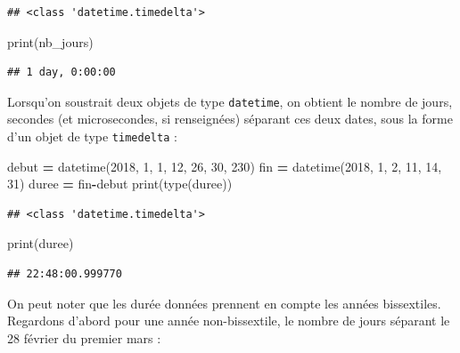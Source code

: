 \documentclass[12pt,]{book}
\newenvironment{Shaded}{\begin{snugshade}}{\end{snugshade}}
\newcommand{\DecValTok}[1]{\textcolor[rgb]{0.00,0.00,0.81}{#1}}
\newcommand{\OperatorTok}[1]{\textcolor[rgb]{0.81,0.36,0.00}{\textbf{#1}}}
\newcommand{\BuiltInTok}[1]{#1}
\newcommand{\NormalTok}[1]{#1}
\numberwithin{equation}{section}
\numberwithin{countremarque}{section}
\begin{document}
\begin{lstlisting}
## <class 'datetime.timedelta'>
\end{lstlisting}

\begin{Shaded}
\begin{Highlighting}[]
\BuiltInTok{print}\NormalTok{(nb_jours)}
\end{Highlighting}
\end{Shaded}

\begin{lstlisting}
## 1 day, 0:00:00
\end{lstlisting}

Lorsqu'on soustrait deux objets de type \texttt{datetime}, on obtient le
nombre de jours, secondes (et microsecondes, si renseignées) séparant
ces deux dates, sous la forme d'un objet de type \texttt{timedelta} :

\begin{Shaded}
\begin{Highlighting}[]
\NormalTok{debut }\OperatorTok{=}\NormalTok{ datetime(}\DecValTok{2018}\NormalTok{, }\DecValTok{1}\NormalTok{, }\DecValTok{1}\NormalTok{, }\DecValTok{12}\NormalTok{, }\DecValTok{26}\NormalTok{, }\DecValTok{30}\NormalTok{, }\DecValTok{230}\NormalTok{)}
\NormalTok{fin }\OperatorTok{=}\NormalTok{ datetime(}\DecValTok{2018}\NormalTok{, }\DecValTok{1}\NormalTok{, }\DecValTok{2}\NormalTok{, }\DecValTok{11}\NormalTok{, }\DecValTok{14}\NormalTok{, }\DecValTok{31}\NormalTok{)}
\NormalTok{duree }\OperatorTok{=}\NormalTok{ fin}\OperatorTok{-}\NormalTok{debut}
\BuiltInTok{print}\NormalTok{(}\BuiltInTok{type}\NormalTok{(duree))}
\end{Highlighting}
\end{Shaded}

\begin{lstlisting}
## <class 'datetime.timedelta'>
\end{lstlisting}

\begin{Shaded}
\begin{Highlighting}[]
\BuiltInTok{print}\NormalTok{(duree)}
\end{Highlighting}
\end{Shaded}

\begin{lstlisting}
## 22:48:00.999770
\end{lstlisting}

On peut noter que les durée données prennent en compte les années
bissextiles. Regardons d'abord pour une année non-bissextile, le nombre
de jours séparant le 28 février du premier mars :
\end{document}
